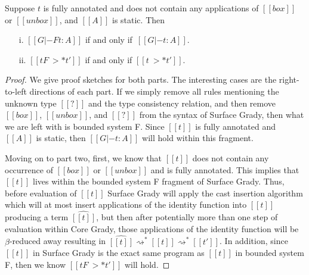 \begin{lemma}
  \label{lemma:F-inclusion}
  Suppose $t$ is fully annotated and does not contain any applications
  of $[[box]]$ or $[[unbox]]$, and $[[A]]$ is static.  Then
  \begin{itemize}
  \item[]
  \item[i.] $[[G |-F t : A]]$ if and only if $\,[[G |- t : A]]$.
  \item[ii.] $[[t F~>* t']]$ if and only if $[[t ~>* t']]$.
  \end{itemize}
\end{lemma}
\begin{proof}
  We give proof sketches for both parts.  The interesting cases are
  the right-to-left directions of each part.  If we simply remove all
  rules mentioning the unknown type $[[?]]$ and the type consistency
  relation, and then remove $[[box]]$, $[[unbox]]$, and $[[?]]$ from
  the syntax of Surface Grady, then what we are left with is bounded
  system F.  Since $[[t]]$ is fully annotated and $[[A]]$ is static,
  then $[[G |- t : A]]$ will hold within this fragment.

  Moving on to part two, first, we know that $[[t]]$ does not contain
  any occurrence of $[[box]]$ or $[[unbox]]$ and is fully annotated.
  This implies that $[[t]]$ lives within the bounded system F fragment
  of Surface Grady. Thus, before evaluation of $[[t]]$ Surface Grady
  will apply the cast insertion algorithm which will at most insert
  applications of the identity function into $[[t]]$ producing a term
  $\widehat{[[t]]}$, but then after potentially more than one step of
  evaluation within Core Grady, those applications of the identity
  function will be $\beta$-reduced away resulting in $\widehat{[[t]]}
  \rightsquigarrow^* [[t]] \rightsquigarrow^* [[t']]$.  In addition,
  since $[[t]]$ in Surface Grady is the exact same program as $[[t]]$
  in bounded system F, then we know $[[t F~>* t']]$ will hold.
\end{proof}
